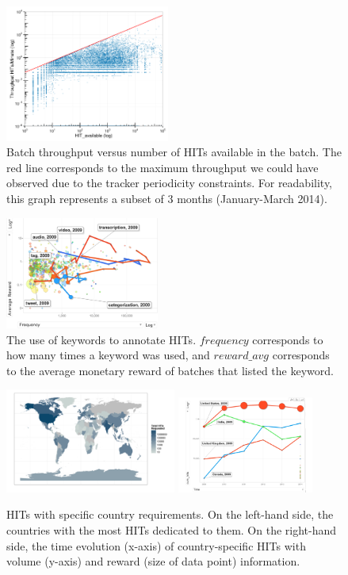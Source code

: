 \begin{figure}[tb]
	\centering
		\includegraphics[width=0.48\textwidth]{figures/motiv_mturk}
	\caption{Batch throughput versus number of HITs available in the batch. The red line corresponds to the maximum throughput we could have observed due to the tracker periodicity constraints. For readability, this graph represents a subset of 3 months (January-March 2014).}
	\label{fig:motiv}
\end{figure}
\begin{figure}[tb]
	\centering
		\includegraphics[width=0.45\textwidth]{figures/tagEvolution}
	\caption{The use of keywords to annotate HITs. $frequency$ corresponds to how many times a keyword was used, and $reward\_avg$ corresponds to the average monetary reward of batches that listed the keyword.}
	\label{fig:tagEvolution}
\end{figure}
\begin{figure}[tb]
	\centering
		\includegraphics[width=0.5\textwidth]{figures/map}
		\includegraphics[width=0.40\textwidth]{figures/countriesTime}
	\caption{HITs with specific country requirements. On the left-hand side, the countries with the most HITs dedicated to them. On the right-hand side, the time evolution (x-axis) of country-specific HITs with volume (y-axis) and reward (size of data point) information.}
	\label{fig:country}
\end{figure}

